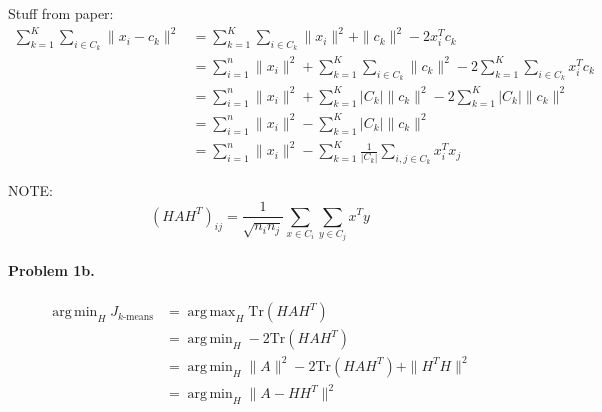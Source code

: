 \documentclass[12pt]{article}
\newcommand{\Tr}{\mathrm{Tr}}
\DeclareMathOperator*{\argmax}{arg\,max}
\DeclareMathOperator*{\argmin}{arg\,min}
\begin{document}
Stuff from paper:
\begin{align*}
\sum_{k=1}^K \sum_{i \in C_k} \|x_i - c_k\|^2 &= \sum_{k=1}^K \sum_{i \in C_k} \|x_i\|^2 + \|c_k\|^2 - 2x_i^T c_k \\
&= \sum_{i=1}^n \|x_i\|^2 + \sum_{k=1}^K \sum_{i \in C_k} \|c_k\|^2 - 2 \sum_{k=1}^K \sum_{i \in C_k} x_i^T c_k \\
&= \sum_{i=1}^n \|x_i\|^2 + \sum_{k=1}^K |C_k| \|c_k\|^2 - 2 \sum_{k=1}^K |C_k| \|c_k\|^2 \\
&= \sum_{i=1}^n \|x_i\|^2 - \sum_{k=1}^K |C_k|\|c_k\|^2\\
&= \sum_{i=1}^n \|x_i\|^2 - \sum_{k=1}^K \frac{1}{|C_k|} \sum_{i, j \in C_k} x_i^T x_j
\end{align*}

NOTE: \[(HAH^T)_{ij} =  \frac{1}{\sqrt{n_i n_j}} \sum_{x \in C_i}\sum_{y \in C_j} x^T y \]

\paragraph{Problem 1b.}
\begin{align*}
\argmin_{H} J_{k\text{-means}} &= \argmax_H \Tr(HAH^T) \\
&= \argmin_H -2\Tr(HAH^T) \\
&= \argmin_H \|A\|^2 -2 \Tr(HAH^T) + \|H^TH\|^2 \\
&= \argmin_H \|A - HH^T\|^2
\end{align*}



\end{document}
